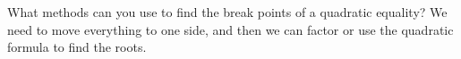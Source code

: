 {What methods can you use to find the break points of a quadratic equality?}
{We need to move everything to one side, and then we can factor or use the quadratic formula to find the roots.}
